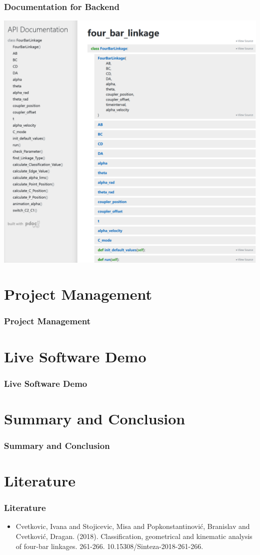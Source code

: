 \documentclass[ucs,10pt]{beamer}
\begin{document}
\begin{frame}
\frametitle{Documentation for Backend}
\centering
\includegraphics[height=0.65\textwidth]{./doc_four_bar_linkage.png}
\end{frame}


\section{Project Management}

\begin{frame}
\frametitle{Project Management}
\end{frame}

\section{Live Software Demo}

\begin{frame}
\frametitle{Live Software Demo} 
\end{frame}

\section{Summary and Conclusion}

\begin{frame}
\frametitle{Summary and Conclusion}
\end{frame}

\section{Literature}
\begin{frame}
\frametitle{Literature}
\begin{itemize}
	\item Cvetkovic, Ivana and Stojicevic, Misa and Popkonstantinović, Branislav and Cvetković, Dragan. (2018). Classification, geometrical and kinematic analysis of four-bar linkages. 261-266. 10.15308/Sinteza-2018-261-266.
\end{itemize}
\end{frame}
\end{document}
